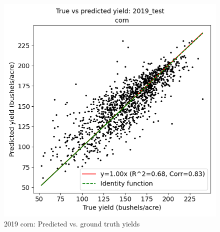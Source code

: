 \begin{figure}[H]
\centering
\includegraphics[width=0.8\columnwidth]{figs/true_vs_predicted_scatter_corn_2019_test.png}
\caption{2019 corn: Predicted vs. ground truth yields}
\label{fig:scatter_2019corn}
\end{figure}


